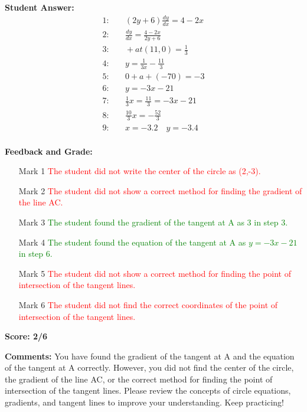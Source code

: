 \documentclass{article}
\begin{document}
\textbf{Student Answer:}
\begin{align*}
1: & \quad (2y+6)\frac{dy}{dx}=4-2x \\
2: & \quad \frac{dy}{dx}=\frac{4-2x}{2y+6} \\
3: & \quad +at(11,0)=\frac{1}{3} \\
4: & \quad y=\frac{1}{3x}-\frac{11}{3} \\
5: & \quad 0 +a+(-70)=-3 \\
6: & \quad y=-3x-21 \\
7: & \quad \frac{1}{3}x=\frac{11}{3}=-3x-21 \\
8: & \quad \frac{10}{3}x=-\frac{52}{3} \\
9: & \quad x=-3.2 \quad y=-3.4 \\
\end{align*}

\textbf{Feedback and Grade:}
\begin{itemize}
\item[Mark 1] \textcolor{red}{The student did not write the center of the circle as (2,-3).}
\item[Mark 2] \textcolor{red}{The student did not show a correct method for finding the gradient of the line AC.}
\item[Mark 3] \textcolor{green}{The student found the gradient of the tangent at A as 3 in step 3.}
\item[Mark 4] \textcolor{green}{The student found the equation of the tangent at A as $y=-3x-21$ in step 6.}
\item[Mark 5] \textcolor{red}{The student did not show a correct method for finding the point of intersection of the tangent lines.}
\item[Mark 6] \textcolor{red}{The student did not find the correct coordinates of the point of intersection of the tangent lines.}
\end{itemize}

\textbf{Score: 2/6}

\textbf{Comments:} You have found the gradient of the tangent at A and the equation of the tangent at A correctly. However, you did not find the center of the circle, the gradient of the line AC, or the correct method for finding the point of intersection of the tangent lines. Please review the concepts of circle equations, gradients, and tangent lines to improve your understanding. Keep practicing!
\end{document}
